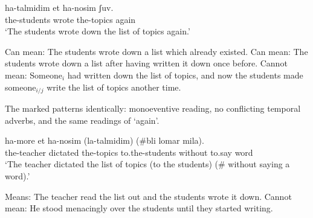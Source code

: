 \begin{exe}
\begin{xlist}
\begin{xlist}
\begin{exe}
\begin{exe}
\begin{xlist}
\begin{exe}
\begin{xlist}
\begin{exe}
\begin{xlist}
\begin{xlist}
\begin{exe}
\begin{xlist}
\begin{exe}
\begin{xlist}
\begin{exe}
\begin{xlist}
\begin{exe}
\begin{exe}
\begin{exe}
\begin{xlist}
\begin{exe}
\begin{exe}
\begin{xlist}
\begin{xlist}
\begin{exe}
\begin{xlist}
\begin{exe}
\begin{exe}
\begin{xlist}
\begin{exe}
\begin{exe}
\begin{xlist}
\begin{exe}
\begin{xlist}
\begin{exe}
\begin{xlist}
\begin{exe}
\begin{xlist}
\begin{exe}
\begin{exe}
\begin{xlist}
\begin{exe}
\begin{exe}
\begin{xlist}
 \ex   
	 \gll ha-talmidim  et ha-nosim ʃuv.\\
 		  the-students wrote  the-topics again\\
 		\glt `The students wrote down the list of topics again.'  
	\begin{xlist}
 	\ex  Can mean: The students wrote down a list which already existed. 
 	\ex  Can mean: The students wrote down a list after having written it down once before. 
 	\ex  Cannot mean: Someone$_{i}$ had written down the list of topics, and now the students made someone$_{i/j}$ write the list of topics another time. 
 	\z
\z 

The marked  patterns identically: monoeventive reading, no conflicting temporal adverbs, and the same readings of `again'.
 \begin{exe}
 \ex  
 		 \gll ha-more  et ha-nosim (la-talmidim) (\#bli lomar mila).\\
 		  the-teacher dictated  the-topics to.the-students without to.say word\\
 		\glt `The teacher dictated the list of topics (to the students) (\# without saying a word).' 
	 \begin{xlist} 
	
 	\ex  Means: The teacher read the list out and the students wrote it down. 
 	\ex  Cannot mean: He stood menacingly over the students until they started writing. 
	 \z

	

\end{xlist}
\end{exe}
\end{xlist}
\end{xlist}
\end{exe}
\end{exe}
\end{xlist}
\end{exe}
\end{exe}
\end{xlist}
\end{exe}
\end{xlist}
\end{exe}
\end{xlist}
\end{exe}
\end{xlist}
\end{exe}
\end{exe}
\end{xlist}
\end{exe}
\end{exe}
\end{xlist}
\end{exe}
\end{xlist}
\end{xlist}
\end{exe}
\end{exe}
\end{xlist}
\end{exe}
\end{exe}
\end{exe}
\end{xlist}
\end{exe}
\end{xlist}
\end{exe}
\end{xlist}
\end{exe}
\end{xlist}
\end{xlist}
\end{exe}
\end{xlist}
\end{exe}
\end{xlist}
\end{exe}
\end{exe}
\end{xlist}
\end{xlist}
\end{exe}
